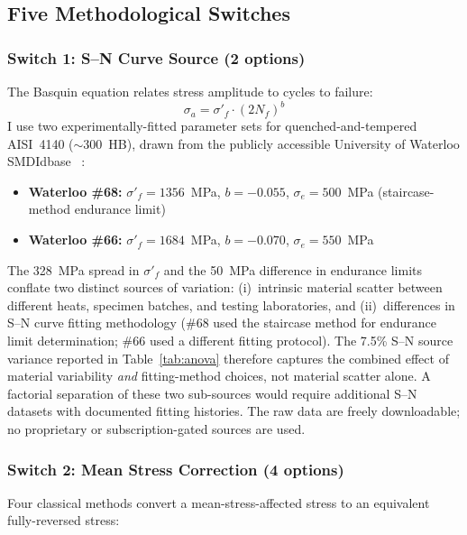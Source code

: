 \documentclass[12pt,a4paper]{article}
\begin{document}
\subsection{Five Methodological Switches}

\subsubsection{Switch 1: S--N Curve Source (2 options)}

The Basquin equation relates stress amplitude to cycles to failure:
\begin{equation}
\sigma_a = \sigma'_f \cdot (2N_f)^b
\label{eq:basquin}
\end{equation}
I use two experimentally-fitted
parameter sets for quenched-and-tempered AISI~4140 ($\sim$300~HB),
drawn from the publicly accessible University of Waterloo SMDIdbase%
~\cite{waterloo_fde}:

\begin{itemize}
  \item \textbf{Waterloo \#68:} $\sigma'_f = 1356$~MPa, $b=-0.055$,
        $\sigma_e=500$~MPa (staircase-method endurance limit)
  \item \textbf{Waterloo \#66:} $\sigma'_f = 1684$~MPa, $b=-0.070$,
        $\sigma_e=550$~MPa
\end{itemize}

The 328~MPa spread in $\sigma'_f$ and the 50~MPa difference in endurance
limits conflate two distinct sources of variation: (i)~intrinsic
material scatter between different heats, specimen batches, and testing
laboratories, and (ii)~differences in S--N curve fitting methodology
(\#68 used the staircase method for endurance limit determination;
\#66 used a different fitting protocol). The 7.5\% S--N source variance
reported in Table~\ref{tab:anova} therefore captures the combined
effect of material variability \emph{and} fitting-method choices, not
material scatter alone. A factorial separation of these two sub-sources
would require additional S--N datasets with documented fitting
histories. The raw data are freely downloadable; no proprietary or
subscription-gated sources are used.

\subsubsection{Switch 2: Mean Stress Correction (4 options)}

Four classical methods convert a mean-stress-affected stress to an
equivalent fully-reversed stress:
\end{document}

